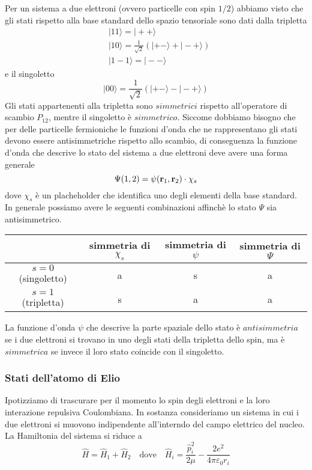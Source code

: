 Per un sistema a due elettroni (ovvero particelle con spin $1/2$) abbiamo visto che gli stati rispetto alla base standard dello spazio tensoriale sono dati dalla tripletta
\begin{align*}
	& |11 \rangle = |++\rangle \\[0.3cm]
	& |10 \rangle = \frac{1}{\sqrt{2}}(|+- \rangle + |-+\rangle) \\[0.3cm]
	& |1-1\rangle = |--\rangle 
\end{align*}
e il singoletto
\begin{equation*}
	|00 \rangle = \frac{1}{\sqrt{2}}(|+- \rangle -|- + \rangle )
\end{equation*}
Gli stati appartenenti alla tripletta sono $simmetrici$ rispetto all'operatore di scambio $P_{12}$, mentre il singoletto \`e $simmetrico$. Siccome dobbiamo bisogno che per delle particelle fermioniche le funzioni d'onda che ne rappresentano gli stati devono essere antisimmetriche rispetto allo scambio, di conseguenza la funzione d'onda che descrive lo stato del sistema a due elettroni deve avere una forma generale 
\begin{equation*}
	\Psi(1,2) = \psi(\bold{r}_1,\bold{r}_2) \cdot \chi_s
\end{equation*}
dove $\chi_s$ \`e un placheholder che identifica uno degli elementi della base standard. In generale possiamo avere le seguenti combinazioni affinch\`e lo stato  $\Psi$ sia antisimmetrico.
\begin{table}[!ht]
    \centering
    \begin{tabular}{c|c|c|c}
         & simmetria di $\chi_s$ & simmetria di $\psi$& simmetria di $\Psi$ \\ \hline
        $s=0$ (singoletto) & a & s & a \\ 
        $s=1$ (tripletta) & s & a & a \\ \hline
    \end{tabular}
\end{table}

La funzione d'onda $\psi$ che descrive la parte spaziale dello stato \`e $antisimmetria$ se i due elettroni si trovano in uno degli stati della tripletta dello spin, ma \`e $simmetrica$ se invece il loro stato coincide con il singoletto.

\subsubsection{Stati dell'atomo di Elio}

Ipotizziamo di trascurare per il momento lo spin degli elettroni  e la loro interazione repulsiva Coulombiana.  In sostanza consideriamo un sistema in cui i due elettroni si muovono indipendente all'interndo del campo elettrico del nucleo. La Hamiltonia del sistema si riduce a 
\begin{equation*}
	\hat{H} = \hat{H}_1 + \hat{H}_2 \quad \text{dove} \quad \hat{H}_i = \frac{\hat{p}_i^2}{2 \mu}-\frac{2e^2}{4 \pi \varepsilon_0 r_i}
\end{equation*}  
\newpage

